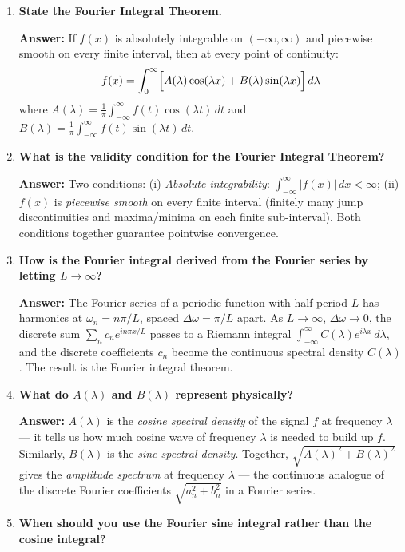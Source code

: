 \documentclass[12pt,a4paper]{article}
\begin{document}
\begin{enumerate}[label=\textbf{Q\arabic*.}]

\item \textbf{State the Fourier Integral Theorem.}

\textbf{Answer:} If $f(x)$ is absolutely integrable on $(-\infty,\infty)$ and piecewise smooth on every finite interval, then at every point of continuity:
\[
f(x) = \int_0^\infty \Bigl[A(\lambda)\cos(\lambda x) + B(\lambda)\sin(\lambda x)\Bigr]\,d\lambda
\]
where $A(\lambda)=\frac{1}{\pi}\int_{-\infty}^{\infty}f(t)\cos(\lambda t)\,dt$ and $B(\lambda)=\frac{1}{\pi}\int_{-\infty}^{\infty}f(t)\sin(\lambda t)\,dt$.

\item \textbf{What is the validity condition for the Fourier Integral Theorem?}

\textbf{Answer:} Two conditions: (i) \textit{Absolute integrability}: $\int_{-\infty}^{\infty}|f(x)|\,dx < \infty$; (ii) $f(x)$ is \textit{piecewise smooth} on every finite interval (finitely many jump discontinuities and maxima/minima on each finite sub-interval). Both conditions together guarantee pointwise convergence.

\item \textbf{How is the Fourier integral derived from the Fourier series by letting $L\to\infty$?}

\textbf{Answer:} The Fourier series of a periodic function with half-period $L$ has harmonics at $\omega_n = n\pi/L$, spaced $\Delta\omega = \pi/L$ apart. As $L\to\infty$, $\Delta\omega\to0$, the discrete sum $\sum_n c_n e^{in\pi x/L}$ passes to a Riemann integral $\int_{-\infty}^\infty C(\lambda)e^{i\lambda x}\,d\lambda$, and the discrete coefficients $c_n$ become the continuous spectral density $C(\lambda)$. The result is the Fourier integral theorem.

\item \textbf{What do $A(\lambda)$ and $B(\lambda)$ represent physically?}

\textbf{Answer:} $A(\lambda)$ is the \textit{cosine spectral density} of the signal $f$ at frequency $\lambda$ --- it tells us how much cosine wave of frequency $\lambda$ is needed to build up $f$. Similarly, $B(\lambda)$ is the \textit{sine spectral density}. Together, $\sqrt{A(\lambda)^2+B(\lambda)^2}$ gives the \textit{amplitude spectrum} at frequency $\lambda$ --- the continuous analogue of the discrete Fourier coefficients $\sqrt{a_n^2+b_n^2}$ in a Fourier series.

\item \textbf{When should you use the Fourier sine integral rather than the cosine integral?}


\end{enumerate}
\end{document}
